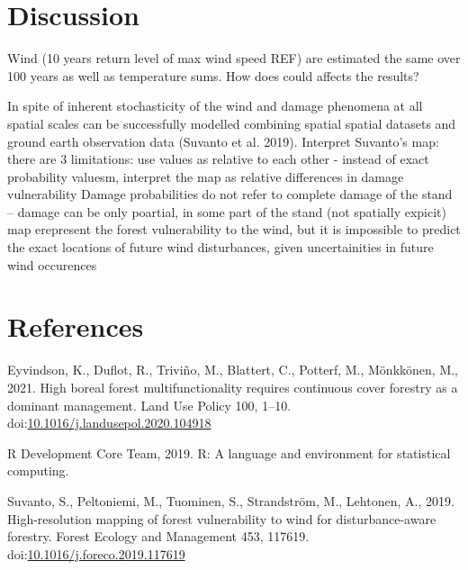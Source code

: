 \documentclass[]{elsarticle} %
\begin{document}
\section{Discussion}\label{discussion}

Wind (10 years return level of max wind speed REF) are estimated the
same over 100 years as well as temperature sums. How does could affects
the results?

In spite of inherent stochasticity of the wind and damage phenomena at
all spatial scales can be successfully modelled combining spatial
spatial datasets and ground earth observation data (Suvanto et al.
2019). Interpret Suvanto's map: there are 3 limitations: use values as
relative to each other - instead of exact probability valuesm, interpret
the map as relative differences in damage vulnerability Damage
probabilities do not refer to complete damage of the stand -- damage can
be only poartial, in some part of the stand (not spatially expicit) map
erepresent the forest vulnerability to the wind, but it is impossible to
predict the exact locations of future wind disturbances, given
uncertainities in future wind occurences

\section*{References}\label{references}

\hypertarget{refs}{}
\hypertarget{ref-Eyvindson2020}{}
Eyvindson, K., Duflot, R., Triviño, M., Blattert, C., Potterf, M.,
Mönkkönen, M., 2021. High boreal forest multifunctionality requires
continuous cover forestry as a dominant management. Land Use Policy 100,
1--10.
doi:\href{https://doi.org/10.1016/j.landusepol.2020.104918}{10.1016/j.landusepol.2020.104918}

\hypertarget{ref-RDevelopmentCoreTeam2019}{}
R Development Core Team, 2019. R: A language and environment for
statistical computing.

\hypertarget{ref-Suvanto2019}{}
Suvanto, S., Peltoniemi, M., Tuominen, S., Strandström, M., Lehtonen,
A., 2019. High-resolution mapping of forest vulnerability to wind for
disturbance-aware forestry. Forest Ecology and Management 453, 117619.
doi:\href{https://doi.org/10.1016/j.foreco.2019.117619}{10.1016/j.foreco.2019.117619}
\end{document}

